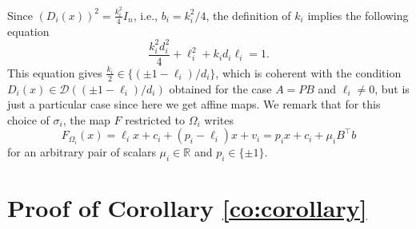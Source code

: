 \documentclass{article}
\theoremstyle{plain}
\theoremstyle{definition}
\theoremstyle{definition}
\newtheorem{lemma}[theorem]{LEMMA}
\theoremstyle{remark}
\theoremstyle{definition}
\theoremstyle{definition}
\theoremstyle{remark}
\numberwithin{equation}{section}
\begin{document}
Since $(D_i(x))^2 = \frac{k^2_i}{4} I_n$, i.e., $b_i=k^2_i/4$, the definition of $k_i$ implies the following equation
\[
\frac{k^2_i d_i^2}{4} + \ell_i^2 + k_i d_i \ell_i = 1.
\]
This equation gives $\frac{k_i}{2} \in \{(\pm1 - \ell_i)/d_i\}$, which is coherent with the condition $D_i(x)\in\mathcal{D}((\pm 1 - \ell_i)/d_i)$ obtained for the case $A=PB$ and $\ell_i\neq 0$, but is just a particular case since here we get affine maps. We remark that for this choice of $\sigma_i$, the map $F$ restricted to $\Omega_i$ writes
\[
F_{\Omega_i}(x)=\ell_i x + c_i + (p_i - \ell_i)x + v_i = p_ix + c_i + \mu_iB^\top b
\]
for an arbitrary pair of scalars $\mu_i\in\mathbb{R}$ and $p_i\in\{\pm 1\}$. 


\section{Proof of Corollary \ref{co:corollary}}\label{app:proofCorollary}
\end{document}

